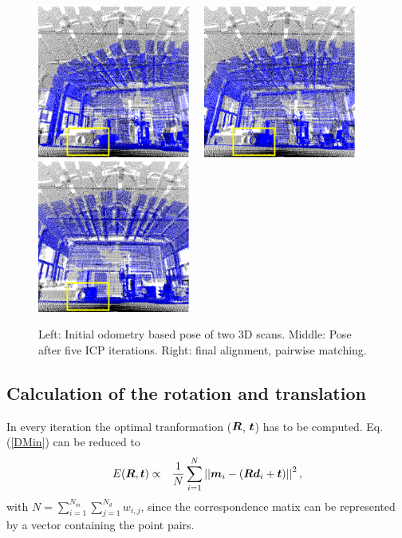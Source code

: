 \documentclass[12pt,dvips]{article}
\renewcommand{\v}[1]{\text{\boldmath $#1$}}
\newcommand{\V}[1]{\text{\boldmath $#1$}}
\newcommand{\M}[1]{\v{#1}}                     %
\newcommand{\norm}[1]{\left | \left | #1 \right | \right |}
\begin{document}
{\begin{figure}
\begin{center}
\includegraphics[width=50mm]{frame1_final}~~
\includegraphics[width=50mm]{frame2_final}~~
\includegraphics[width=50mm]{frame3_final} \\[1.5ex]
\caption{{Left: Initial odometry based pose of two 3D
  scans. Middle: Pose after five ICP iterations. Right: final
  alignment, pairwise matching.
\vspace*{-6mm}
}}\label{samplematch}
\end{center}
\end{figure}


\subsection{Calculation of the rotation and translation}

In every iteration the optimal tranformation ($\M R$, $\V t$)
has to be computed. Eq. (\ref{DMin}) can be reduced to
\begin{eqnarray}
E(\M R, \V t) & \propto & \frac{1}{N} \sum_{i=1}^N
\norm{\V m_i - (\M R \V d_i + \V t)}^2,\label{DualDMin}
\end{eqnarray}
with $N = \sum_{i=1}^{N_m}\sum_{j=1}^{N_d}w_{i,j}$, since the
correspondence matix can be represented by a vector containing
the point pairs.

}
\end{document}
